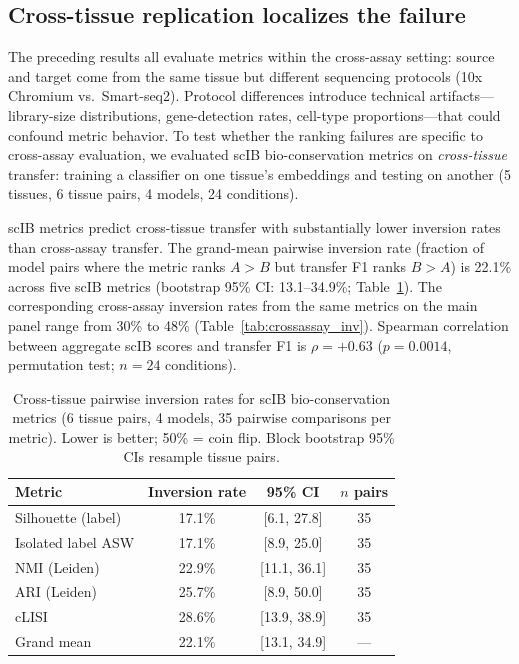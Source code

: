 \documentclass[11pt]{article}
\begin{document}
\subsection{Cross-tissue replication localizes the failure}
\label{sec:crosstissue}

The preceding results all evaluate metrics within the cross-assay
setting: source and target come from the same tissue but different
sequencing protocols (10x Chromium vs.\ Smart-seq2). Protocol
differences introduce technical artifacts---library-size distributions,
gene-detection rates, cell-type proportions---that could confound metric
behavior. To test whether the ranking failures are specific to
cross-assay evaluation, we evaluated scIB bio-conservation metrics on
\emph{cross-tissue} transfer: training a classifier on one tissue's
embeddings and testing on another (5 tissues, 6 tissue pairs, 4 models,
24 conditions).

scIB metrics predict cross-tissue transfer with substantially lower
inversion rates than cross-assay transfer. The grand-mean pairwise
inversion rate (fraction of model pairs where the metric ranks
$A > B$ but transfer F1 ranks $B > A$) is 22.1\% across five scIB
metrics (bootstrap 95\% CI: 13.1--34.9\%;
Table~\ref{tab:crosstissue}). The corresponding cross-assay inversion
rates from the same metrics on the main panel range from 30\% to 48\%
(Table~\ref{tab:crossassay_inv}). Spearman correlation between
aggregate scIB scores and transfer F1 is $\rho = +0.63$ ($p = 0.0014$,
permutation test; $n = 24$ conditions).

\begin{table}[t]
\centering
\caption{Cross-tissue pairwise inversion rates for scIB
bio-conservation metrics (6 tissue pairs, 4 models, 35 pairwise
comparisons per metric). Lower is better; 50\% = coin flip. Block
bootstrap 95\% CIs resample tissue pairs.}
\label{tab:crosstissue}
\small
\begin{tabular}{@{}lccc@{}}
\toprule
Metric & Inversion rate & 95\% CI & $n$ pairs \\
\midrule
Silhouette (label)   & 17.1\% & [6.1, 27.8] & 35 \\
Isolated label ASW   & 17.1\% & [8.9, 25.0] & 35 \\
NMI (Leiden)         & 22.9\% & [11.1, 36.1] & 35 \\
ARI (Leiden)         & 25.7\% & [8.9, 50.0] & 35 \\
cLISI                & 28.6\% & [13.9, 38.9] & 35 \\
\midrule
Grand mean           & 22.1\% & [13.1, 34.9] & --- \\
\bottomrule
\end{tabular}
\end{table}
\end{document}
